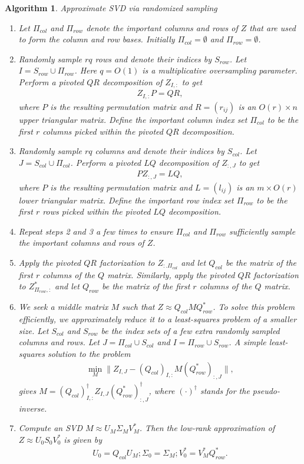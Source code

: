 \documentclass[11pt]{article}
\newtheorem{algo}[theorem]{Algorithm}
\begin{document}
\begin{algo}{Approximate SVD via randomized sampling}
\begin{enumerate}
\label{algo}
\item 
Let $\Pi_{col}$ and $\Pi_{row}$ denote the important columns and rows of $Z$ that are used to form the column and row bases. Initially $\Pi_{col} = \emptyset$ and $\Pi_{row} = \emptyset$.
\item
Randomly sample $rq$ rows and denote their indices by $S_{row}$. Let $I = S_{row}\cup \Pi_{row}$. Here $q = O(1)$ is a multiplicative oversampling parameter. Perform a pivoted $QR$ decomposition of $Z_{I,:}$ to get 
\begin{eqnarray}
Z_{I,:}P = QR,
\end{eqnarray}
where $P$ is the resulting permutation matrix and $R = (r_{ij})$ is an $O(r) \times n$ upper triangular matrix. Define the important column index set $\Pi_{col}$ to be the first $r$ columns picked within the pivoted $QR$ decomposition.
\item
 Randomly sample $rq$ columns and denote their indices by $S_{col}$. Let $J = S_{col}\cup \Pi_{col}$. Perform a pivoted $LQ$ decomposition of $Z_{:,J}$ to get
\begin{eqnarray}
PZ_{:,J} = LQ,
\end{eqnarray}
where $P$ is the resulting permutation matrix and $L = (l_{ij})$ is an $m \times O(r)$ lower triangular matrix. Define the important row index set $\Pi_{row}$ to be the first $r$ rows picked within the pivoted $LQ$ decomposition.
\item
Repeat steps 2 and 3 a few times to ensure $\Pi_{col}$ and $\Pi_{row}$ sufficiently sample the important columns and rows of $Z$.
\item
Apply the pivoted $QR$ factorization to $Z_{:.\Pi_{col}}$ and let $Q_{col}$ be the matrix of the first $r$ columns of the $Q$ matrix. Similarly, apply the pivoted $QR$ factorization to $Z_{\Pi_{row},:}^{*}$ and let $Q_{row}$ be the
matrix of the first $r$ columns of the $Q$ matrix.
\item
We seek a middle matrix $M$ such that $Z \approx Q_{col}MQ_{row}^{*}$. To solve this problem efficiently, we approximately reduce it to a least-squares problem of a smaller size. Let $S_{col}$ and $S_{row}$ be the index sets of a few extra randomly sampled columns and rows. Let $J = \Pi_{col} \cup S_{col}$ and
$I = \Pi_{row} \cup S_{row}$. A simple least-squares solution to the problem
\begin{eqnarray}
\min\limits_{M}\parallel Z_{I,J}-(Q_{col})_{I,:}M(Q_{row}^{*})_{:,J}\parallel,
\end{eqnarray}
gives $M = (Q_{col})_{I,:}^{\dagger}Z_{I,J}(Q_{row}^{*})_{:,J}^{\dagger}$, where $(\cdot)^{\dagger}$ stands for the pseudo-inverse.
\item
Compute an SVD $M \approx U_{M}\Sigma_{M}V_{M}^{*}$. Then the low-rank approximation of $Z \approx U_{0}S_{0}V_{0}^{*}$ is given by
\begin{eqnarray}
U_{0} = Q_{col}U_{M}; \Sigma_{0} = \Sigma_{M}; V_{0}^{*} = V_{M}^{*} Q_{row}^{*}.
\end{eqnarray}
\end{enumerate}
\end{algo}
\end{document}
